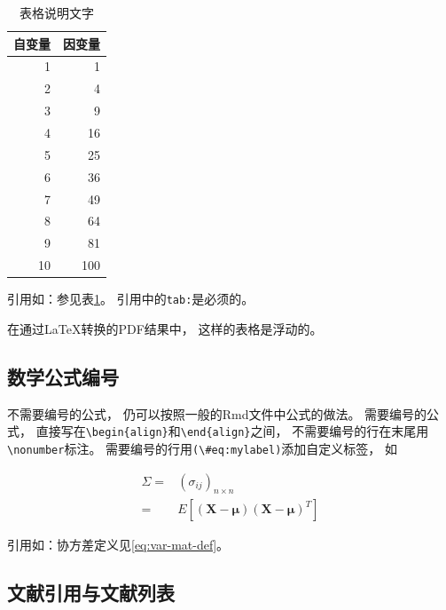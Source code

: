 \documentclass[
]{book}
\begin{document}
\begin{table}

\caption{\label{tab:u-w-tab-ex01}表格说明文字}
\centering
\begin{tabular}[t]{r|r}
\hline
自变量 & 因变量\\
\hline
1 & 1\\
\hline
2 & 4\\
\hline
3 & 9\\
\hline
4 & 16\\
\hline
5 & 25\\
\hline
6 & 36\\
\hline
7 & 49\\
\hline
8 & 64\\
\hline
9 & 81\\
\hline
10 & 100\\
\hline
\end{tabular}
\end{table}

引用如：参见表\ref{tab:u-w-tab-ex01}。
引用中的\texttt{tab:}是必须的。

在通过LaTeX转换的PDF结果中，
这样的表格是浮动的。

\hypertarget{usage-writing-math}{%
\subsection{数学公式编号}\label{usage-writing-math}}

不需要编号的公式，
仍可以按照一般的Rmd文件中公式的做法。
需要编号的公式，
直接写在\texttt{\textbackslash{}begin\{align\}}和\texttt{\textbackslash{}end\{align\}}之间，
不需要编号的行在末尾用\texttt{\textbackslash{}nonumber}标注。
需要编号的行用\texttt{(\textbackslash{}\#eq:mylabel)}添加自定义标签，
如

\begin{align}
\Sigma =&  (\sigma_{ij})_{n\times n} \nonumber \\
=& E[(\boldsymbol{X} - \boldsymbol{\mu}) (\boldsymbol{X} - \boldsymbol{\mu})^T ] 
\label{eq:var-mat-def}
\end{align}

引用如：协方差定义见\eqref{eq:var-mat-def}。

\hypertarget{ux6587ux732eux5f15ux7528ux4e0eux6587ux732eux5217ux8868}{%
\subsection{文献引用与文献列表}\label{ux6587ux732eux5f15ux7528ux4e0eux6587ux732eux5217ux8868}}
\end{document}
